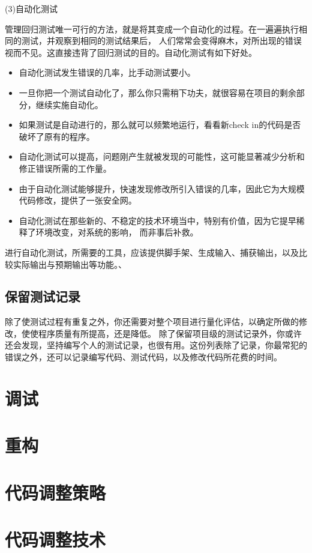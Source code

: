 \documentclass{article}
\begin{document}
\par
(3)自动化测试
\par
管理回归测试唯一可行的方法，就是将其变成一个自动化的过程。在一遍遍执行相同的测试，并观察到相同的测试结果后，
人们常常会变得麻木，对所出现的错误视而不见。这直接违背了回归测试的目的。自动化测试有如下好处。
\begin{itemize}
    \item 自动化测试发生错误的几率，比手动测试要小。
    \item 一旦你把一个测试自动化了，那么你只需稍下功夫，就很容易在项目的剩余部分，继续实施自动化。
    \item 如果测试是自动进行的，那么就可以频繁地运行，看看新check in的代码是否破坏了原有的程序。
    \item 自动化测试可以提高，问题刚产生就被发现的可能性，这可能显著减少分析和修正错误所需的工作量。
    \item 由于自动化测试能够提升，快速发现修改所引入错误的几率，因此它为大规模代码修改，提供了一张安全网。
    \item 自动化测试在那些新的、不稳定的技术环境当中，特别有价值，因为它提早稀释了环境改变，对系统的影响，
    而非事后补救。
\end{itemize}
进行自动化测试，所需要的工具，应该提供脚手架、生成输入、捕获输出，以及比较实际输出与预期输出等功能。、

\subsection{保留测试记录}
除了使测试过程有重复之外，你还需要对整个项目进行量化评估，以确定所做的修改，使使程序质量有所提高，还是降低。
除了保留项目级的测试记录外，你或许还会发现，坚持编写个人的测试记录，也很有用。这份列表除了记录，你最常犯的
错误之外，还可以记录编写代码、测试代码，以及修改代码所花费的时间。


\section{调试}

\section{重构}

\section{代码调整策略}

\section{代码调整技术}
\end{document}
